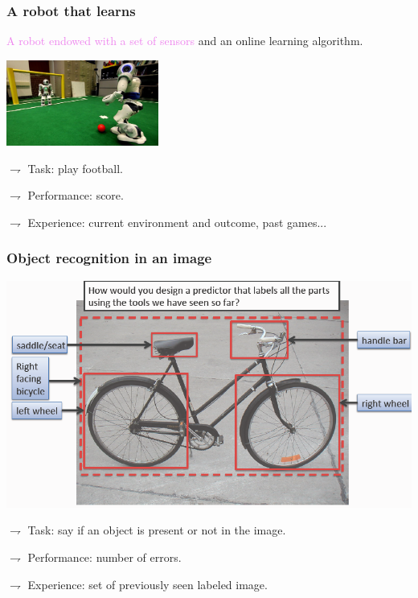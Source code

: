 \documentclass[9pt]{beamer}
\begin{document}
\begin{frame}
\frametitle{A robot that learns}
\textcolor{violet}{A robot endowed with a set of sensors} and an online learning algorithm.
\begin{center}
\includegraphics[width=5cm]{soccer-playing-robots}
\end{center}

$\rightharpoondown$   \alert{Task}: play football.
 
$\rightharpoondown$  \alert{Performance}: score.

$\rightharpoondown$  \alert{Experience}: current environment and outcome, past games...

\end{frame}

\begin{frame}
\frametitle{Object recognition in an image}
\centerline{\includegraphics[width=.8\textwidth]{object-detection}}
\vspace*{.5cm}

$\rightharpoondown$   \alert{Task}: say if an object is present or not in the image.

$\rightharpoondown$  \alert{Performance}:  number of errors.

$\rightharpoondown$  \alert{Experience}: set of previously seen labeled image.

\end{frame}
\end{document}

